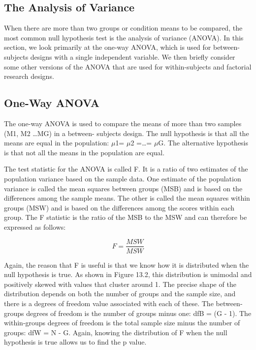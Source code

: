 \subsection{The Analysis of Variance}

When there are more than two groups or condition means to be compared, the most common null hypothesis test is the analysis of variance (ANOVA). In this section, we look primarily at the one-way ANOVA, which is used for between-subjects designs with a single independent variable. We then briefly consider some other versions of the ANOVA that are used for within-subjects and factorial research designs.


\subsection{One-Way ANOVA}

The one-way ANOVA is used to compare the means of more than two samples (M1, M2 \ldots MG) in a between- subjects design. The null hypothesis is that all the means are equal in the population: $\mu$1= $\mu$2 =\ldots = $\mu$G. The alternative hypothesis is that not all the means in the population are equal.


The test statistic for the ANOVA is called F. It is a ratio of two estimates of the population variance based on the sample data. One estimate of the population variance is called the mean squares between groups (MSB) and is based on the differences among the sample means. The other is called the mean squares within groups (MSW) and is based on the differences among the scores within each group. The F statistic is the ratio of the MSB to the MSW and can therefore be expressed as follows:


\begin{equation}
F= \frac{MSW}{MSW}
\end{equation}

Again, the reason that F is useful is that we know how it is distributed when the null hypothesis is true.
As shown in Figure 13.2, this distribution is unimodal and positively skewed with values that cluster around 1. The precise shape of the distribution depends on both the number of groups and the sample size, and there is a degrees of freedom value associated with each of these. The between-groups degrees of freedom is the number of groups minus one: dfB = (G - 1). The within-groups degrees of freedom is the total sample size minus the number of groups: dfW = N - G. Again, knowing the distribution of F when the null hypothesis is true allows us to find the p value.


